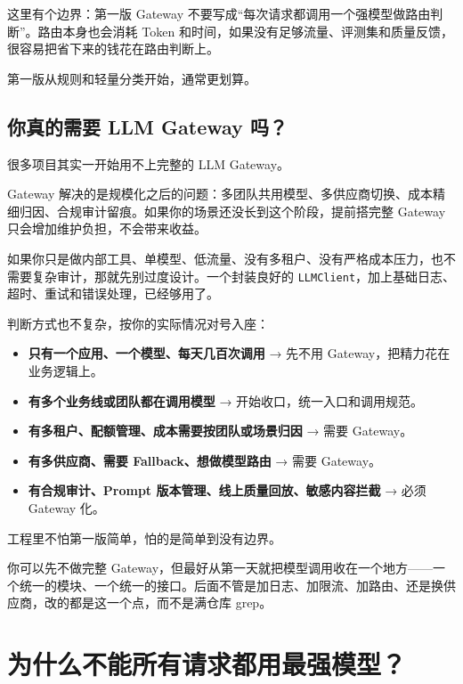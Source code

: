 \documentclass[10pt,a4paper]{ctexart}
\begin{document}
这里有个边界：第一版 Gateway 不要写成“每次请求都调用一个强模型做路由判断”。路由本身也会消耗 Token 和时间，如果没有足够流量、评测集和质量反馈，很容易把省下来的钱花在路由判断上。



第一版从规则和轻量分类开始，通常更划算。



\subsection{你真的需要 LLM Gateway 吗？}


很多项目其实一开始用不上完整的 LLM Gateway。



Gateway 解决的是规模化之后的问题：多团队共用模型、多供应商切换、成本精细归因、合规审计留痕。如果你的场景还没长到这个阶段，提前搭完整 Gateway 只会增加维护负担，不会带来收益。



如果你只是做内部工具、单模型、低流量、没有多租户、没有严格成本压力，也不需要复杂审计，那就先别过度设计。一个封装良好的 \texttt{LLMClient}，加上基础日志、超时、重试和错误处理，已经够用了。



判断方式也不复杂，按你的实际情况对号入座：


\begin{itemize}[itemsep=2pt, topsep=4pt]
  \item \textbf{只有一个应用、一个模型、每天几百次调用} → 先不用 Gateway，把精力花在业务逻辑上。
  \item \textbf{有多个业务线或团队都在调用模型} → 开始收口，统一入口和调用规范。
  \item \textbf{有多租户、配额管理、成本需要按团队或场景归因} → 需要 Gateway。
  \item \textbf{有多供应商、需要 Fallback、想做模型路由} → 需要 Gateway。
  \item \textbf{有合规审计、Prompt 版本管理、线上质量回放、敏感内容拦截} → 必须 Gateway 化。
\end{itemize}


工程里不怕第一版简单，怕的是简单到没有边界。



你可以先不做完整 Gateway，但最好从第一天就把模型调用收在一个地方——一个统一的模块、一个统一的接口。后面不管是加日志、加限流、加路由、还是换供应商，改的都是这一个点，而不是满仓库 grep。



\section{为什么不能所有请求都用最强模型？}
\end{document}
